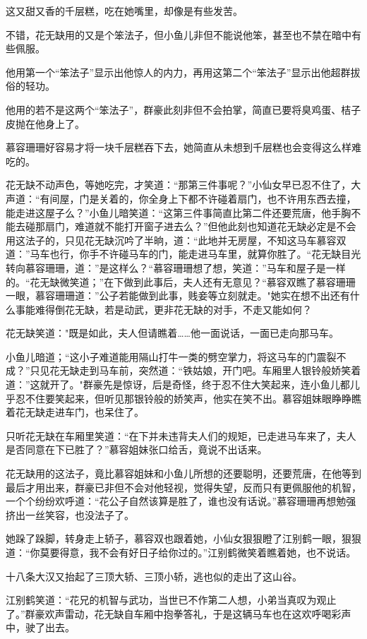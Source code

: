 \documentclass[12pt,oneside]{book}
\begin{document}
这又甜又香的千层糕，吃在她嘴里，却像是有些发苦。

不错，花无缺用的又是个笨法子，但小鱼儿非但不能说他笨，甚至也不禁在暗中有些佩服。

他用第一个``笨法子''显示出他惊人的内力，再用这第二个``笨法子''显示出他超群拔俗的轻功。

他用的若不是这两个``笨法子''，群豪此刻非但不会拍掌，简直已要将臭鸡蛋、桔子皮抛在他身上了。

慕容珊珊好容易才将一块千层糕吞下去，她简直从未想到千层糕也会变得这么样难吃的。

花无缺不动声色，等她吃完，才笑道：``那第三件事呢？''小仙女早已忍不住了，大声道：``有间屋，门是关着的，你全身上下都不许碰着扇门，也不许用东西去撞，能走进这屋子么？''小鱼儿暗笑道：``这第三件事简直比第二件还要荒唐，他手胸不能去碰那扇门，难道就不能打开窗子进去么？''但他此刻也知道花无缺必定是不会用这法子的，只见花无缺沉吟了半晌，道：``此地并无房屋，不知这马车慕容双道：''马车也行，你手不许碰马车的门，能走进马车里，就算你胜了。``花无缺目光转向慕容珊珊，道：''是这样么？``慕容珊珊想了想，笑道：''马车和屋子是一样的。``花无缺微笑道；''在下做到此事后，夫人还有无意见？``慕容双瞧了慕容珊珊一眼，慕容珊珊道：''公子若能做到此事，贱妾等立刻就走。"她实在想不出还有什么事能难得倒花无缺，若是动武，更非花无缺的对手，不走又能如何？

花无缺笑道："既是如此，夫人但请瞧着\ldots\ldots 他一面说话，一面已走向那马车。

小鱼儿暗道；``这小子难道能用隔山打牛一类的劈空掌力，将这马车的门震裂不成？''只见花无缺走到马车前，突然道：``铁姑娘，开门吧。车厢里人银铃般娇笑着道：''这就开了。"群豪先是惊讶，后是奇怪，终于忍不住大笑起来，连小鱼儿都儿乎忍不住要笑起来，但听见那银铃般的娇笑声，他实在笑不出。慕容姐妹眼睁睁瞧着花无缺走进车门，也呆住了。

只听花无缺在车厢里笑道：``在下并未违背夫人们的规矩，已走进马车来了，夫人是否同意在下已胜了？''慕容姐妹张口给舌，竟说不出话来。

花无缺用的这法子，竟比慕容姐妹和小鱼儿所想的还要聪明，还要荒唐，在他等到最后才用出来，群豪已非但不会对他轻视，觉得失望，反而只有更佩服他的机智，一个个纷纷欢呼道：``花公子自然该算是胜了，谁也没有话说。''慕容珊珊再想勉强挤出一丝笑容，也没法子了。

她跺了跺脚，转身走上轿子，慕容双也跟着她，小仙女狠狠瞪了江别鹤一眼，狠狠道：``你莫要得意，我不会有好日子给你过的。''江别鹤微笑着瞧着她，也不说话。

十八条大汉又抬起了三顶大轿、三顶小轿，逃也似的走出了这山谷。

江别鹤笑道：``花兄的机智与武功，当世已不作第二人想，小弟当真叹为观止了。''群豪欢声雷动，花无缺自车厢中抱拳答礼，于是这辆马车也在这欢呼喝彩声中，驶了出去。
\end{document}
